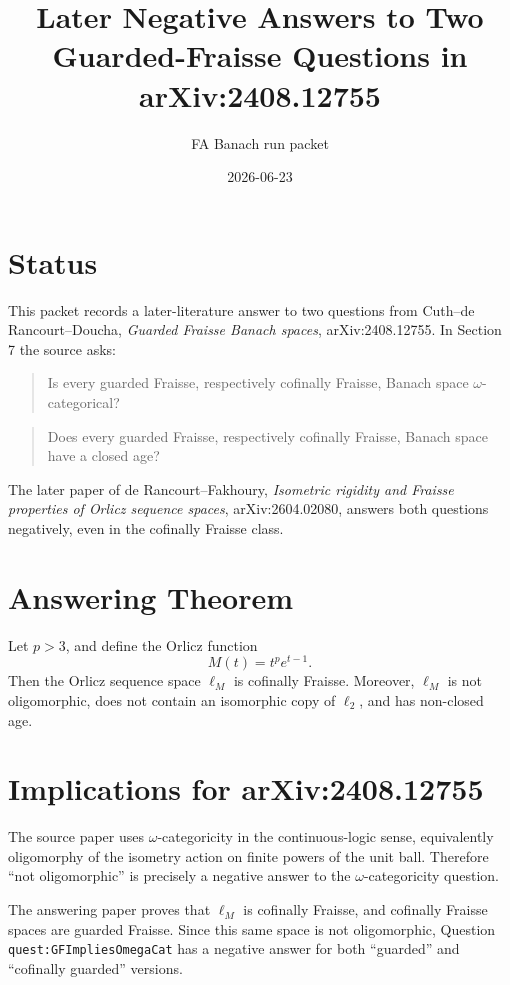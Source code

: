 \documentclass[11pt]{amsart}
\title{Later Negative Answers to Two Guarded-Fraisse Questions in arXiv:2408.12755}
\author{FA Banach run packet}
\date{2026-06-23}
\begin{document}
\maketitle

\section*{Status}

This packet records a later-literature answer to two questions from
Cuth--de Rancourt--Doucha, \emph{Guarded Fraisse Banach spaces},
arXiv:2408.12755. In Section 7 the source asks:

\begin{quote}
Is every guarded Fraisse, respectively cofinally Fraisse, Banach space
\(\omega\)-categorical?
\end{quote}

\begin{quote}
Does every guarded Fraisse, respectively cofinally Fraisse, Banach space have
a closed age?
\end{quote}

The later paper of de Rancourt--Fakhoury, \emph{Isometric rigidity and
Fraisse properties of Orlicz sequence spaces}, arXiv:2604.02080, answers both
questions negatively, even in the cofinally Fraisse class.

\section*{Answering Theorem}

Let \(p>3\), and define the Orlicz function
\[
  M(t)=t^p e^{t-1}.
\]
Then the Orlicz sequence space \(\ell_M\) is cofinally Fraisse. Moreover,
\(\ell_M\) is not oligomorphic, does not contain an isomorphic copy of
\(\ell_2\), and has non-closed age.

\section*{Implications for arXiv:2408.12755}

The source paper uses \(\omega\)-categoricity in the continuous-logic sense,
equivalently oligomorphy of the isometry action on finite powers of the unit
ball. Therefore ``not oligomorphic'' is precisely a negative answer to the
\(\omega\)-categoricity question.

The answering paper proves that \(\ell_M\) is cofinally Fraisse, and cofinally
Fraisse spaces are guarded Fraisse. Since this same space is not oligomorphic,
Question \texttt{quest:GFImpliesOmegaCat} has a negative answer for both
``guarded'' and ``cofinally guarded'' versions.
\end{document}
